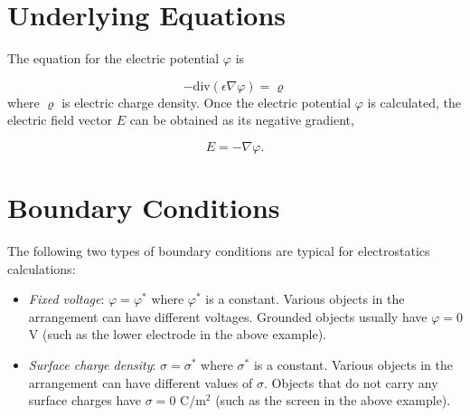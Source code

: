 \documentclass{article}
\begin{document}
\section{Underlying Equations}

The equation for the electric potential $\varphi$ is 

$$
-\mbox{div}(\epsilon \nabla \varphi) = \varrho
$$
where $\varrho$ is electric charge density. Once the electric potential 
$\varphi$ is calculated, the electric field vector $E$ can be obtained
as its negative gradient,

$$
E = -\nabla \varphi.
$$

\section{Boundary Conditions}

The following two types of boundary conditions are typical for electrostatics calculations:
\begin{itemize}
\item {\em Fixed voltage}: $\varphi = \varphi^*$ where $\varphi^*$ is a constant.
      Various objects in the arrangement can have different voltages. Grounded objects 
      usually have $\varphi = 0$ V (such as the lower electrode in the above example).
\item {\em Surface charge density}: $\sigma = \sigma^*$ where $\sigma^*$ is a constant.
      Various objects in the arrangement can have different values of $\sigma$. Objects 
      that do not carry any surface charges have $\sigma = 0$ C/m$^2$ (such as the screen 
      in the above example). 
\end{itemize}
\end{document}
